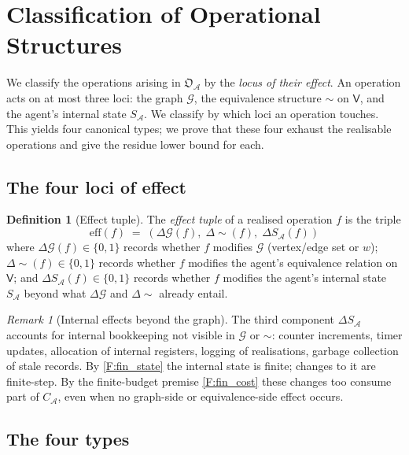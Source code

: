 \documentclass[11pt,a4paper]{article}
\theoremstyle{thmstyle}
\theoremstyle{definition}
\newtheorem{definition}[theorem]{Definition}
\theoremstyle{remark}
\newtheorem{remark}[theorem]{Remark}
\newcommand{\Graph}{\mathcal{G}}
\newcommand{\Vrt}{\mathsf{V}}
\newcommand{\Agent}{\mathcal{A}}
\newcommand{\OpStr}{\mathfrak{O}}
\begin{document}
\section{Classification of Operational Structures}
\label{sec:classification}

We classify the operations arising in $\OpStr_\Agent$ by the
\emph{locus of their effect}. An operation acts on at most three
loci: the graph $\Graph$, the equivalence structure
$\sim$ on $\Vrt$, and the agent's internal state $S_\Agent$. We
classify by which loci an operation touches. This yields four
canonical types; we prove that these four exhaust the realisable
operations and give the residue lower bound for each.

\subsection{The four loci of effect}

\begin{definition}[Effect tuple]
\label{def:effect_tuple}
The \emph{effect tuple} of a realised operation $f$ is the triple
\[
  \mathrm{eff}(f) \;=\; (\Delta\Graph(f),\; \Delta{\sim}(f),\;
  \Delta S_\Agent(f))
\]
where $\Delta\Graph(f) \in \{0, 1\}$ records whether $f$ modifies
$\Graph$ (vertex/edge set or $w$); $\Delta{\sim}(f) \in \{0, 1\}$
records whether $f$ modifies the agent's equivalence relation on
$\Vrt$; and $\Delta S_\Agent(f) \in \{0, 1\}$ records whether $f$
modifies the agent's internal state $S_\Agent$ beyond what
$\Delta\Graph$ and $\Delta{\sim}$ already entail.
\end{definition}

\begin{remark}[Internal effects beyond the graph]
\label{rem:internal_beyond}
The third component $\Delta S_\Agent$ accounts for internal
bookkeeping not visible in $\Graph$ or $\sim$: counter increments,
timer updates, allocation of internal registers, logging of
realisations, garbage collection of stale records. By
\cref{F:fin_state} the internal state is finite; changes to it are
finite-step. By the finite-budget premise \cref{F:fin_cost} these
changes too consume part of $C_\Agent$, even when no
graph-side or equivalence-side effect occurs.
\end{remark}

\subsection{The four types}
\end{document}
